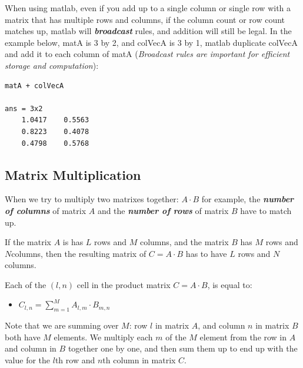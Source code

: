 \documentclass[
]{book}
\providecommand{\tightlist}{%
  \setlength{\itemsep}{0pt}\setlength{\parskip}{0pt}}
\begin{document}
When using matlab, even if you add up to a single column or single row
with a matrix that has multiple rows and columns, if the column count or
row count matches up, matlab will \textbf{\emph{broadcast}} rules, and addition
will still be legal. In the example below, matA is 3 by 2, and colVecA
is 3 by 1, matlab duplicate colVecA and add it to each column of matA
(\emph{Broadcast rules are important for efficient storage and computation}):

\begin{verbatim}
matA + colVecA

ans = 3x2    
    1.0417    0.5563
    0.8223    0.4078
    0.4798    0.5768
\end{verbatim}

\hypertarget{matrix-multiplication}{%
\subsection{\texorpdfstring{\textbf{Matrix Multiplication}}{Matrix Multiplication}}\label{matrix-multiplication}}

When we try to multiply two matrixes together: \(A\cdot B\) for example,
the \textbf{\emph{number of columns}} of matrix \(A\) and the \textbf{\emph{number of rows}}
of matrix \(B\) have to match up.

If the matrix \(A\) is has \(L\) rows and \(M\) columns, and the matrix \(B\)
has \(M\) rows and \(N\)columns, then the resulting matrix of \(C=A\cdot B\)
has to have \(L\) rows and \(N\) columns.

Each of the \((l,n)\) cell in the product matrix \(C=A\cdot B\), is equal
to:

\begin{itemize}
\tightlist
\item
  \(\displaystyle C_{l,n} =\sum_{m=1}^M A_{l,m} \cdot B_{m,n}\)
\end{itemize}

Note that we are summing over \(M\): row \(l\) in matrix \(A\), and column \(n\)
in matrix \(B\) both have \(M\) elements. We multiply each \(m\) of the \(M\)
element from the row in \(A\) and column in \(B\) together one by one, and
then sum them up to end up with the value for the \(l\)th row and \(n\)th
column in matrix \(C\).
\end{document}
